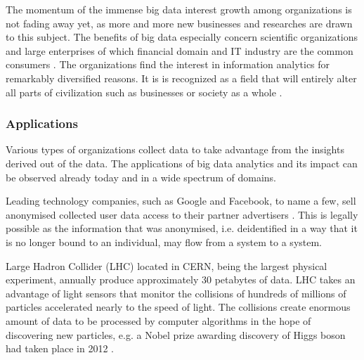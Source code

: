 \documentclass[a4paper,twoside,12pt]{book}
\begin{document}
The momentum of the immense big data interest growth among organizations is not fading away yet, as more and more new businesses and researches are drawn to this subject. The benefits of big data especially concern scientific organizations and large enterprises of which financial domain and IT industry are the common consumers \cite{bib:anonymization_chaos}. The organizations find the interest in information analytics for remarkably diversified reasons. It is is recognized as a field that will entirely alter all parts of civilization such as businesses or society as a whole \cite{bib:big_data_in_practice}.

\subsubsection{Applications}

Various types of organizations collect data to take advantage from the insights derived out of the data. The applications of big data analytics and its impact can be observed already today and in a wide spectrum of domains. 


Leading technology companies, such as Google and Facebook, to name a few, sell anonymised collected user data access to their partner advertisers \cite{bib:big_data_in_practice}. This is legally possible as the information that was anonymised, i.e. deidentified in a way that it is no longer bound to an individual, may flow from a system to a system.

Large Hadron Collider (LHC) located in CERN, being the largest physical experiment, annually produce approximately 30 petabytes of data. LHC takes an advantage of light sensors that monitor the collisions of hundreds of millions of particles accelerated nearly to the speed of light. The collisions create enormous amount of data to be processed by computer algorithms in the hope of discovering new particles, e.g. a Nobel prize awarding discovery of Higgs boson had taken place in 2012 \cite{bib:cern}.
\end{document}
